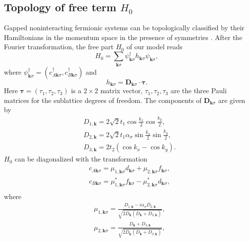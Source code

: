 \documentclass[amsmath,superscriptaddress,showpacs,aps,prb,twocolumn]{revtex4-1}
\begin{document}
\subsection{Topology of free term $H_0$}\label{topo_free_part}
\par Gapped noninteracting fermionic systems can be topologically classified by their Hamiltonians in the momentum space in the presence of symmetries \cite{SRFL_PRB2008}. After the Fourier transformation, the free part $H_0$ of our model reads
\begin{equation}
H_0=\sum_{\mathbf{k}\sigma}\psi^{\dagger}_{\mathbf{k}\sigma}h_{\mathbf{k}\sigma}\psi_{\mathbf{k}\sigma},
\end{equation}
where $\psi^{\dagger}_{\mathbf{k}\sigma}=(c^{\dagger}_{A\mathbf{k}\sigma},c^{\dagger}_{B\mathbf{k}\sigma})$ and
\begin{equation}
h_{\mathbf{k}\sigma}={\mathbf{D}_{\mathbf{k}\sigma}}\cdot\bm{\tau}.
\end{equation}
Here $\bm{\tau}=(\tau_{1},\tau_{2},\tau_{3})$ is a $2\times2$ matrix vector, $\tau_{1},\tau_{2},\tau_{3}$ are the three Pauli matrices for the sublattice degrees of freedom. The components of $\mathbf{D}_{\mathbf{k}\sigma}$ are given by
\begin{equation}
\begin{aligned}
&D_{1,\mathbf{k}}=2\sqrt{2}t_{1}\cos\frac{k_{x}}{2}\cos\frac{k_{y}}{2},\\
&D_{2,\mathbf{k}}=2\sqrt{2}t_{1}\alpha_\sigma\sin\frac{k_{x}}{2}\sin\frac{k_{y}}{2},\\
&D_{3,\mathbf{k}}=2t_{2}(\cos k_{x}-\cos k_{y}).
\end{aligned}
\end{equation}
$H_0$ can be diagonalized with the transformation
\begin{equation}
\begin{aligned}
&c_{A\mathbf{k}\sigma}=\mu_{1,\mathbf{k}\sigma}d_{\mathbf{k}\sigma}+\mu_{2,\mathbf{k}\sigma}f_{\mathbf{k}\sigma},\\
&c_{B\mathbf{k}\sigma}=\mu^{\ast}_{1,\mathbf{k}\sigma}f_{\mathbf{k}\sigma}-\mu^{\ast}_{2,\mathbf{k}\sigma}d_{\mathbf{k}\sigma},\\
\end{aligned}
\end{equation}
where
\begin{equation}
\begin{aligned}
&\mu_{1,\mathbf{k}\sigma}=\frac{D_{1,\mathbf{k}}-i\alpha_\sigma D_{2,\mathbf{k}}}{\sqrt{2D_{\mathbf{k}}(D_{\mathbf{k}}+D_{3,\mathbf{k}})}},\\
&\mu_{2,\mathbf{k}\sigma}=\frac{D_{\mathbf{k}}+D_{3,\mathbf{k}}}{\sqrt{2D_{\mathbf{k}}(D_{\mathbf{k}}+D_{3,\mathbf{k}})}},\\
\end{aligned}
\end{equation}
\end{document}
